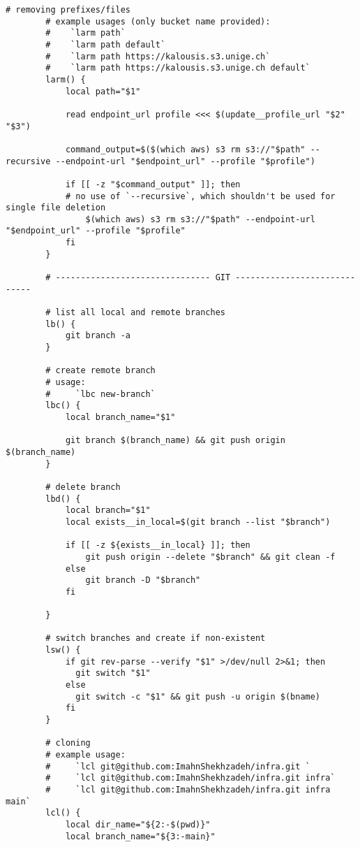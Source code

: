 \documentclass[12pt, a4paper]{scrbook}
\numberwithin{equation}{section}
\theoremstyle{definition}
\theoremstyle{definition}
\begin{document}
\begin{lstlisting}[style=mystylebash, label=alg:bashrc_contents, xleftmargin=\parindent]
		# removing prefixes/files
		# example usages (only bucket name provided):
		#    `larm path`
		#    `larm path default`
		#    `larm path https://kalousis.s3.unige.ch`
		#    `larm path https://kalousis.s3.unige.ch default`
		larm() {
			local path="$1"
			
			read endpoint_url profile <<< $(update__profile_url "$2" "$3")
			
			command_output=$($(which aws) s3 rm s3://"$path" --recursive --endpoint-url "$endpoint_url" --profile "$profile")
			
			if [[ -z "$command_output" ]]; then
			# no use of `--recursive`, which shouldn't be used for single file deletion
				$(which aws) s3 rm s3://"$path" --endpoint-url "$endpoint_url" --profile "$profile"
			fi
		}
		
		# ------------------------------- GIT -----------------------------
		
		# list all local and remote branches
		lb() {
			git branch -a
		}
		
		# create remote branch
		# usage:
		#     `lbc new-branch`
		lbc() {
			local branch_name="$1"

			git branch $(branch_name) && git push origin $(branch_name)
		}
		
		# delete branch
		lbd() {
			local branch="$1" 
			local exists__in_local=$(git branch --list "$branch")
			
			if [[ -z ${exists__in_local} ]]; then
				git push origin --delete "$branch" && git clean -f
			else
				git branch -D "$branch"
			fi

		}

		# switch branches and create if non-existent
		lsw() {                                                                                                           
			if git rev-parse --verify "$1" >/dev/null 2>&1; then                                                            
			  git switch "$1"                                                                                               
			else                                                                                                            
			  git switch -c "$1" && git push -u origin $(bname)
			fi                                                                                                              
		}
	
		# cloning
		# example usage:
		#     `lcl git@github.com:ImahnShekhzadeh/infra.git `
		#     `lcl git@github.com:ImahnShekhzadeh/infra.git infra`
		#     `lcl git@github.com:ImahnShekhzadeh/infra.git infra main`
		lcl() {
			local dir_name="${2:-$(pwd)}"
			local branch_name="${3:-main}"
			

\end{lstlisting}
\end{document}
